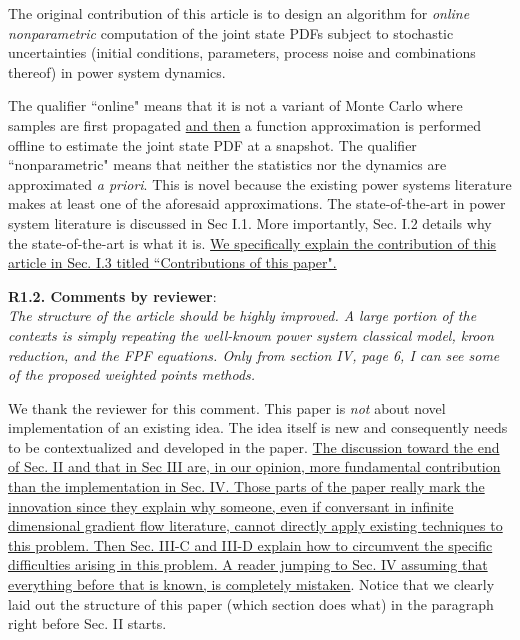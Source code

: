 \documentclass[12pt,onecolumn]{IEEEtran}
\newcommand{\blue}{\color{blue}}
\newcommand{\nib}{\noindent  {\bf Response:} }
\begin{document}
{\nib {\blue The original contribution of this article is to design an algorithm for \emph{online nonparametric} computation of the joint state PDFs subject to stochastic uncertainties (initial conditions, parameters, process noise and combinations thereof) in power system dynamics. 

The qualifier ``online" means that it is not a variant of Monte Carlo where samples are first propagated \ul{and then} a function approximation is performed offline to estimate the joint state PDF at a snapshot. The qualifier ``nonparametric" means that neither the statistics nor the dynamics are approximated \emph{a priori}. This is novel because the existing power systems literature makes at least one of the aforesaid approximations. The state-of-the-art in power system literature is discussed in Sec I.1. More importantly, Sec. I.2 details why the state-of-the-art is what it is. \ul{We specifically explain the contribution of this article in Sec. I.3 titled ``Contributions of this paper".}
}}



\noindent
{\bf R1.2. Comments by reviewer}:\\
{\em The structure of the article should be highly improved. A large portion of the contexts is simply repeating the well-known power system classical model, kroon reduction, and the FPF equations.  Only from section IV, page 6, I can see some of the proposed weighted points methods.}


{\nib{ \blue We thank the reviewer for this comment. This paper is \emph{not} about novel implementation of an existing idea. The idea itself is new and consequently needs to be contextualized and developed in the paper. \ul{The discussion toward the end of Sec. II and that in Sec III are, in our opinion, more fundamental contribution than the implementation in Sec. IV. Those parts of the paper really mark the innovation since they explain why someone, even if conversant in infinite dimensional gradient flow literature, cannot directly apply existing techniques to this problem. Then Sec. III-C and III-D explain how to circumvent the specific difficulties arising in this problem. A reader jumping to Sec. IV assuming that everything before that is known, is completely mistaken}. Notice that we clearly laid out the structure of this paper (which section does what) in the paragraph right before Sec. II starts.}}
\end{document}
